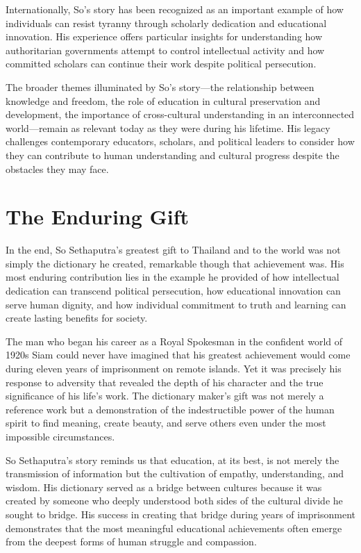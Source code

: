 \documentclass[
  Letterpaper,
]{scrbook}
\begin{document}
Internationally, So's story has been recognized as an important example
of how individuals can resist tyranny through scholarly dedication and
educational innovation. His experience offers particular insights for
understanding how authoritarian governments attempt to control
intellectual activity and how committed scholars can continue their work
despite political persecution.

The broader themes illuminated by So's story---the relationship between
knowledge and freedom, the role of education in cultural preservation
and development, the importance of cross-cultural understanding in an
interconnected world---remain as relevant today as they were during his
lifetime. His legacy challenges contemporary educators, scholars, and
political leaders to consider how they can contribute to human
understanding and cultural progress despite the obstacles they may face.

\section{The Enduring Gift}\label{the-enduring-gift}

In the end, So Sethaputra's greatest gift to Thailand and to the world
was not simply the dictionary he created, remarkable though that
achievement was. His most enduring contribution lies in the example he
provided of how intellectual dedication can transcend political
persecution, how educational innovation can serve human dignity, and how
individual commitment to truth and learning can create lasting benefits
for society.

The man who began his career as a Royal Spokesman in the confident world
of 1920s Siam could never have imagined that his greatest achievement
would come during eleven years of imprisonment on remote islands. Yet it
was precisely his response to adversity that revealed the depth of his
character and the true significance of his life's work. The dictionary
maker's gift was not merely a reference work but a demonstration of the
indestructible power of the human spirit to find meaning, create beauty,
and serve others even under the most impossible circumstances.

So Sethaputra's story reminds us that education, at its best, is not
merely the transmission of information but the cultivation of empathy,
understanding, and wisdom. His dictionary served as a bridge between
cultures because it was created by someone who deeply understood both
sides of the cultural divide he sought to bridge. His success in
creating that bridge during years of imprisonment demonstrates that the
most meaningful educational achievements often emerge from the deepest
forms of human struggle and compassion.
\end{document}

